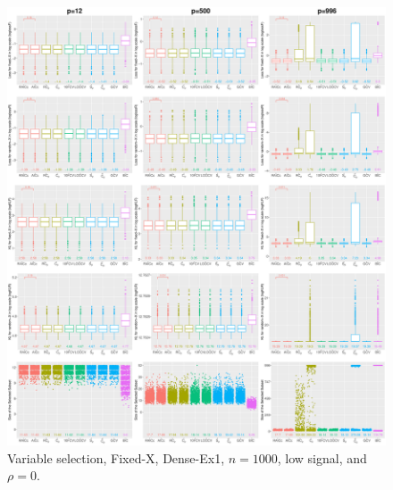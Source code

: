 \begin{figure}[!ht]
\centering
\includegraphics[width=\textwidth]{figures/supplement/fixedx/subset_selection/Dense-Ex1_n1000_lsnr_rho0.eps}
\caption{Variable selection, Fixed-X, Dense-Ex1, $n=1000$, low signal, and $\rho=0$.}
\end{figure}
\clearpage
